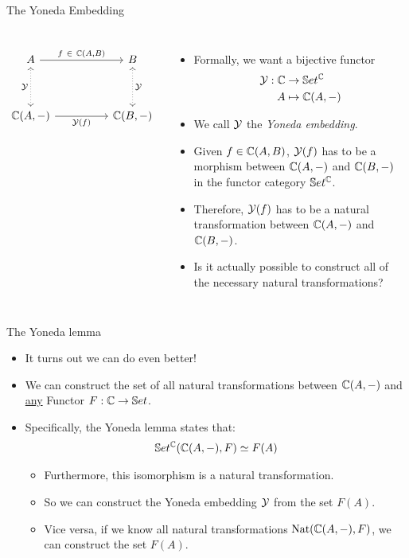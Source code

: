 \begin{frame}[fragile]{The Yoneda Embedding}
	\begin{columns}
		\[\begin{tikzcd}
			A && B \\
			\\
			{\bC(A, -)} && {\bC(B,-)}
			\arrow["{f\ \in\ \mathbb{C}(A,B)}", from=1-1, to=1-3]
			\arrow["{\mathcal{Y}}"', dotted, leftrightarrow, from=1-1, to=3-1]
			\arrow["{\mathcal{Y}}", dotted, leftrightarrow, from=1-3, to=3-3]
			\arrow["{\mathcal{Y}(f)}"', from=3-1, to=3-3]
		\end{tikzcd}\]
		\begin{itemize}
			\item Formally, we want a bijective functor
			\begin{align*}
				\mathcal{Y} : \mathbb{C} &\to \mathbb{S} et^{\mathbb{C}}\\
				A &\mapsto \mathbb{C}(A,-)
			\end{align*}
			\vspace{-16pt}\pause\item We call $\mathcal{Y}$ the \textit{Yoneda embedding}.
			\pause\item Given $f \in \mathbb{C}(A,B)$, $\mathcal{Y}(f)$ has to be a morphism between $\mathbb{C}(A, -)$ and $\mathbb{C}(B, -)$ in the functor category $\mathbb{S} et^{\mathbb{C}}$.
			\pause\item Therefore, $\mathcal{Y}(f)$ has to be a natural transformation between $\mathbb{C}(A, -)$ and $\mathbb{C}(B, -)$. 
			\pause\item Is it actually possible to construct all of the necessary natural transformations?
		\end{itemize}
	\end{columns}
\end{frame}
\begin{frame}{The Yoneda lemma}
	\begin{itemize}
		\item It turns out we can do even better!
		\pause\item We can construct the set of all natural transformations between $\mathbb{C}(A, -)$ and \underline{any} Functor $F :\mathbb{C} \to \mathbb{S} et$.
		\pause\item Specifically, the Yoneda lemma states that:
		\begin{align*}
			\mathbb{S}et^{\mathbb{C}}(\mathbb{C}(A,-), F) \simeq F(A)
		\end{align*}
		\begin{itemize}
			\vspace{-18pt}\pause\item Furthermore, this isomorphism is a natural transformation.
			\pause\item So we can construct the Yoneda embedding $\mathcal{Y}$ from the set $F(A)$.
			\pause\item Vice versa, if we know all natural transformations $\text{Nat}(\mathbb{C}(A,-), F)$, we can construct the set $F(A)$.
		\end{itemize}
	\end{itemize}
\end{frame}

